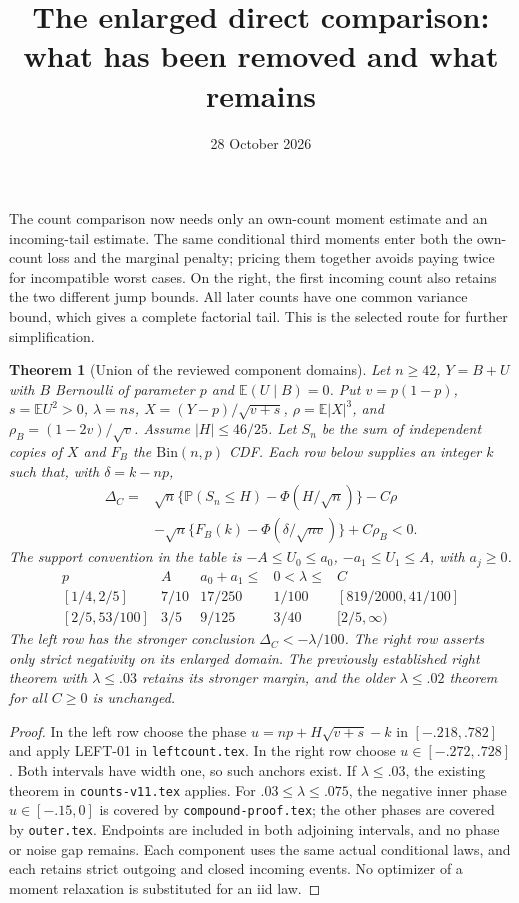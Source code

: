 \documentclass[11pt]{article}
\title{The enlarged direct comparison: what has been removed and what remains}
\author{}\date{28 October 2026}
\newtheorem{theorem}{Theorem}
\newcommand{\E}{\mathbb E}\newcommand{\Pp}{\mathbb P}
\begin{document}
\maketitle

The count comparison now needs only an own-count moment estimate and an
incoming-tail estimate. The same conditional third moments enter both the
own-count loss and the marginal penalty; pricing them together avoids paying
twice for incompatible worst cases. On the right, the first incoming count
also retains the two different jump bounds. All later counts have one common
variance bound, which gives a complete factorial tail. This is the selected
route for further simplification.

\begin{theorem}[Union of the reviewed component domains]\label{thm:union}
Let $n\ge42$, $Y=B+U$ with $B$ Bernoulli of parameter $p$ and
$\E(U\mid B)=0$. Put $v=p(1-p)$, $s=\E U^2>0$, $\lambda=ns$,
$X=(Y-p)/\sqrt{v+s}$, $\rho=\E|X|^3$, and
$\rho_B=(1-2v)/\sqrt v$. Assume $|H|\le46/25$.
Let $S_n$ be the sum of independent copies of $X$ and $F_B$ the
$\mathrm{Bin}(n,p)$ CDF. Each row below supplies an integer $k$ such that,
with $\delta=k-np$,
\begin{align*}
 \Delta_C={}&\sqrt n\{\Pp(S_n\le H)-\Phi(H/\sqrt n)\}-C\rho\\
 &-\sqrt n\{F_B(k)-\Phi(\delta/\sqrt{nv})\}+C\rho_B<0.
\end{align*}
The support convention in the table is
$-A\le U_0\le a_0$, $-a_1\le U_1\le A$, with $a_j\ge0$.
\[
\begin{array}{c|c|c|c|c}
 p&A&a_0+a_1\le&0<\lambda\le&C\\\hline
 [1/4,2/5]&7/10&17/250&1/100&[819/2000,41/100]\\
 {[2/5,53/100]}&3/5&9/125&3/40&[2/5,\infty)
\end{array}
\]
The left row has the stronger conclusion $\Delta_C<-\lambda/100$.
The right row asserts only strict negativity on its enlarged domain.
The previously established right theorem with $\lambda\le.03$ retains
its stronger margin, and the older $\lambda\le.02$ theorem for all
$C\ge0$ is unchanged.
\end{theorem}
\begin{proof}
In the left row choose the phase $u=np+H\sqrt{v+s}-k$ in
$[-.218,.782]$ and apply LEFT-01 in \texttt{leftcount.tex}.
In the right row choose $u\in[-.272,.728]$. Both intervals have
width one, so such anchors exist. If $\lambda\le.03$, the existing
theorem in \texttt{counts-v11.tex} applies. For $.03\le\lambda\le.075$,
the negative inner phase $u\in[-.15,0]$ is covered by
\texttt{compound-proof.tex}; the other phases are covered by
\texttt{outer.tex}. Endpoints are included in both adjoining intervals,
and no phase or noise gap remains. Each component uses the same actual
conditional laws, and each retains strict outgoing and closed incoming
events. No optimizer of a moment relaxation is substituted for an iid law.
\end{proof}
\end{document}
